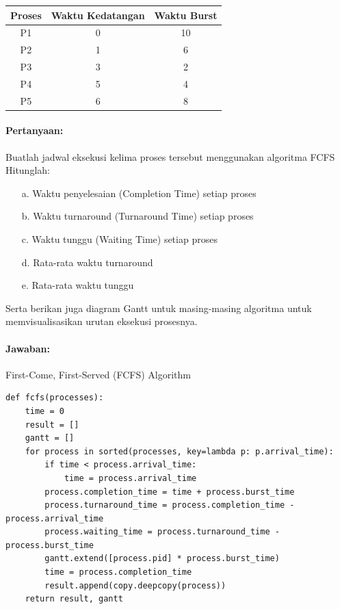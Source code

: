 \documentclass[12pt]{article}
\begin{document}
\lstset{style=mystyle}


\begin{tabular}{|c|c|c|}
  \hline
  \textbf{Proses} & \textbf{Waktu Kedatangan} & \textbf{Waktu Burst} \\
  \hline
  P1 & 0 & 10 \\
  \hline
  P2 & 1 & 6 \\
  \hline
  P3 & 3 & 2 \\
  \hline
  P4 & 5 & 4 \\
  \hline
  P5 & 6 & 8 \\
  \hline
\end{tabular}


\paragraph{Pertanyaan:} Buatlah jadwal eksekusi kelima proses tersebut menggunakan algoritma FCFS Hitunglah:
   \begin{itemize}
      \item[a.] Waktu penyelesaian (Completion Time) setiap proses
      \item[b.] Waktu turnaround (Turnaround Time) setiap proses
      \item[c.] Waktu tunggu (Waiting Time) setiap proses
      \item[d.] Rata-rata waktu turnaround
      \item[e.] Rata-rata waktu tunggu
   \end{itemize}

Serta berikan juga diagram Gantt untuk masing-masing algoritma untuk memvisualisasikan urutan eksekusi prosesnya.

\paragraph{Jawaban:} 

First-Come, First-Served (FCFS) Algorithm

\begin{lstlisting}[]
def fcfs(processes):
    time = 0
    result = []
    gantt = []
    for process in sorted(processes, key=lambda p: p.arrival_time):
        if time < process.arrival_time:
            time = process.arrival_time
        process.completion_time = time + process.burst_time
        process.turnaround_time = process.completion_time - process.arrival_time
        process.waiting_time = process.turnaround_time - process.burst_time
        gantt.extend([process.pid] * process.burst_time)
        time = process.completion_time
        result.append(copy.deepcopy(process))
    return result, gantt
\end{lstlisting}
\end{document}
